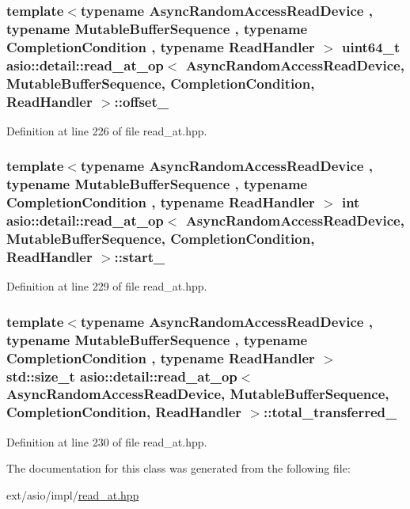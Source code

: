 \subsubsection[{offset\+\_\+}]{\setlength{\rightskip}{0pt plus 5cm}template$<$typename Async\+Random\+Access\+Read\+Device , typename Mutable\+Buffer\+Sequence , typename Completion\+Condition , typename Read\+Handler $>$ uint64\+\_\+t {\bf asio\+::detail\+::read\+\_\+at\+\_\+op}$<$ Async\+Random\+Access\+Read\+Device, Mutable\+Buffer\+Sequence, Completion\+Condition, Read\+Handler $>$\+::offset\+\_\+}\label{classasio_1_1detail_1_1read__at__op_aa7b0a3f1f48ffb4563f7616a0ee4d780}


Definition at line 226 of file read\+\_\+at.\+hpp.

\hypertarget{classasio_1_1detail_1_1read__at__op_ace06581639486fe718eb5e74a6e20653}{}
\subsubsection[{start\+\_\+}]{\setlength{\rightskip}{0pt plus 5cm}template$<$typename Async\+Random\+Access\+Read\+Device , typename Mutable\+Buffer\+Sequence , typename Completion\+Condition , typename Read\+Handler $>$ int {\bf asio\+::detail\+::read\+\_\+at\+\_\+op}$<$ Async\+Random\+Access\+Read\+Device, Mutable\+Buffer\+Sequence, Completion\+Condition, Read\+Handler $>$\+::start\+\_\+}\label{classasio_1_1detail_1_1read__at__op_ace06581639486fe718eb5e74a6e20653}


Definition at line 229 of file read\+\_\+at.\+hpp.

\hypertarget{classasio_1_1detail_1_1read__at__op_ae6d82afb3a9e72a97e7b5054624d08dc}{}
\subsubsection[{total\+\_\+transferred\+\_\+}]{\setlength{\rightskip}{0pt plus 5cm}template$<$typename Async\+Random\+Access\+Read\+Device , typename Mutable\+Buffer\+Sequence , typename Completion\+Condition , typename Read\+Handler $>$ std\+::size\+\_\+t {\bf asio\+::detail\+::read\+\_\+at\+\_\+op}$<$ Async\+Random\+Access\+Read\+Device, Mutable\+Buffer\+Sequence, Completion\+Condition, Read\+Handler $>$\+::total\+\_\+transferred\+\_\+}\label{classasio_1_1detail_1_1read__at__op_ae6d82afb3a9e72a97e7b5054624d08dc}


Definition at line 230 of file read\+\_\+at.\+hpp.



The documentation for this class was generated from the following file\+:\begin{DoxyCompactItemize}
\item 
ext/asio/impl/\hyperlink{impl_2read__at_8hpp}{read\+\_\+at.\+hpp}\end{DoxyCompactItemize}
